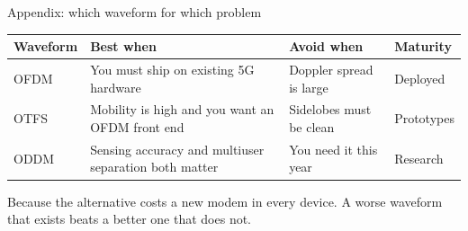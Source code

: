 
\begin{frame}{Appendix: which waveform for which problem}
  \scriptsize
  \renewcommand{\arraystretch}{1.24}
  \vspace{0.15em}
  \begin{tabularx}{\textwidth}{
      >{\raggedright\arraybackslash}p{1.35cm}
      >{\raggedright\arraybackslash}X
      >{\raggedright\arraybackslash}X
      >{\raggedright\arraybackslash}p{2.2cm}}
    \toprule
    \textbf{Waveform} & \textbf{Best when} & \textbf{Avoid when} & \textbf{Maturity} \\
    \midrule
    OFDM & You must ship on existing 5G hardware & Doppler spread is large &
      Deployed \\
    OTFS & Mobility is high and you want an OFDM front end & Sidelobes must be
      clean & Prototypes \\
    ODDM & Sensing accuracy and multiuser separation both matter & You need it this
      year & Research \\
    \bottomrule
  \end{tabularx}

  \vspace{0.5em}
     {Because the alternative costs a new modem in every device. A worse waveform
      that exists beats a better one that does not.}
\end{frame}

